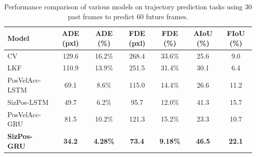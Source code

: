 \documentclass[12pt,oneside]{book} %
\begin{document}
\begin{table}[H]
    \centering
    \caption{Performance comparison of various models on trajectory prediction tasks using 30 past frames to predict 60 future frames.}
    \begin{adjustbox}{max width=\textwidth}
        \begin{tabular}{lcccccc}
            \toprule
            \textbf{Model}                      & \textbf{ADE (pxl)} & \textbf{ADE (\%)} & \textbf{FDE (pxl)} & \textbf{FDE (\%)} & \textbf{AIoU (\%)} & \textbf{FIoU (\%)} \\ 
            \midrule
            CV~\cite{MultipleObjectForecasting} & 129.6              & 16.2\%            & 268.4              & 33.6\%            & 25.6               & 9.0                \\ 
            LKF~\cite{kalman1960new}            & 110.9              & 13.9\%            & 251.5              & 31.4\%            & 30.1               & 6.4                \\ 
            \hdashline
            PosVelAcc-LSTM                      & 69.1               & 8.6\%             & 115.0              & 14.4\%            & 26.6               & 11.2               \\ 
            SizPos-LSTM                         & 49.7               & 6.2\%             & 95.7               & 12.0\%            & 41.3               & 15.7               \\ 
            PosVelAcc-GRU                       & 81.5               & 10.2\%            & 121.3              & 15.2\%            & 23.3               & 10.7               \\ 
            \textbf{SizPos-GRU}                 & \textbf{34.2}      & \textbf{4.28\%}   & \textbf{73.4}      & \textbf{9.18\%}   & \textbf{46.5}      & \textbf{22.1}      \\ 
            \bottomrule
        \end{tabular}
    \end{adjustbox}
    \label{tab:fusion-gru-results-60frames}
\end{table}
\end{document}
